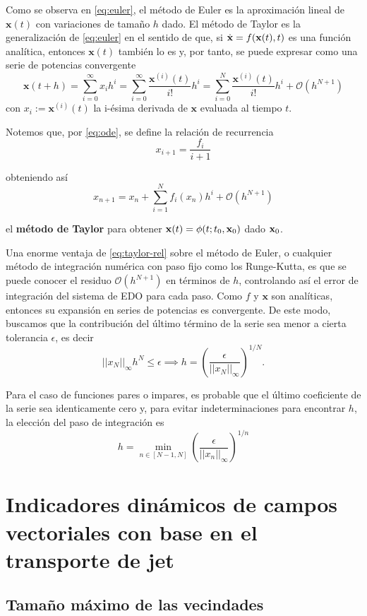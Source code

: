 Como se observa en \ref{eq:euler}, el método de Euler es la aproximación lineal de $\mathbf{x}(t)$ con variaciones de tamaño $h$ dado. El método de Taylor es la generalización de \ref{eq:euler} en el sentido de que, si $\dot{\mathbf{x}} = f(\mathbf{x}(t),t)$ es una función analítica, entonces $\mathbf{x}(t)$ también lo es y, por tanto, se puede expresar como una serie de potencias convergente 
\begin{equation}
\mathbf{x}(t + h) = \sum_{i=0}^\infty x_i h^i = \sum_{i=0}^\infty \frac{\mathbf{x}^{(i)}(t)}{i!}h^i 
= \sum_{i=0}^N \frac{\mathbf{x}^{(i)}(t)}{i!}h^i + \mathcal{O}(h^{N+1})
\label{eq:anal-exp}
\end{equation}
con $x_i := \mathbf{x}^{(i)}(t)$ la i-ésima derivada de $\mathbf{x}$ evaluada al tiempo $t$.

Notemos que, por \ref{eq:ode}, se define la relación de recurrencia
\begin{equation}
x_{i+1} = \frac{f_i}{i+1}
\label{eq:rec-rel}
\end{equation}

obteniendo así 
\begin{equation}
x_{n+1} = x_n + \sum_{i=1}^N f_i(x_n)h^i + \mathcal{O}(h^{N+1})
\label{eq:taylor-rel}
\end{equation}

el \textbf{método de Taylor} para obtener $\mathbf{x}(t) = \phi(t;t_0,\mathbf{x}_0)$ dado $\mathbf{x}_0$.

Una enorme ventaja de \ref{eq:taylor-rel} sobre el método de Euler, o cualquier método de integración numérica con paso fijo como los Runge-Kutta, es que se puede conocer el residuo $\mathcal{O}(h^{N+1})$ en términos de $h$, controlando así el error de integración del sistema de EDO para cada paso. Como $f$ y $\mathbf{x}$ son analíticas, entonces su expansión en series de potencias es convergente. De este modo, buscamos que la contribución del último término de la serie sea menor a cierta tolerancia $\epsilon$, es decir
\begin{equation*}
||x_N||_\infty h^N \leq \epsilon \implies h = \left( \frac{\epsilon}{||x_N||_\infty} \right)^{1/N}.
\end{equation*} 

Para el caso de funciones pares o impares, es probable que el último coeficiente de la serie sea identicamente cero y, para evitar indeterminaciones para encontrar $h$, la elección del paso de integración es
\begin{equation}
h = \min_{n \in [N-1,N]}{ \left( \frac{\epsilon}{||x_n||_\infty} \right)^{1/n} }
\end{equation} 

\section{Indicadores dinámicos de campos vectoriales con base en el transporte de jet}
\label{sec:ind-dinam}


\subsection{Tamaño máximo de las vecindades}